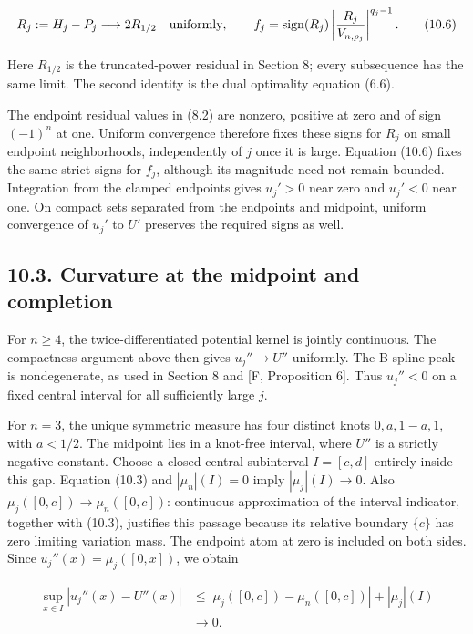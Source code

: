 \documentclass[11pt]{article}
\begin{document}
\[
R_j:=H_j-P_j\longrightarrow2R_{1/2}\quad\hbox{uniformly},
\qquad
f_j=\operatorname{sign}(R_j)
\left|\frac{R_j}{V_{n,p_j}}\right|^{q_j-1}.
\tag{10.6}
\]

Here \(R_{1/2}\) is the truncated-power residual in Section 8; every
subsequence has the same limit. The second identity is the dual
optimality equation (6.6).

The endpoint residual values in (8.2) are nonzero, positive at zero and
of sign \((-1)^n\) at one. Uniform convergence therefore fixes these
signs for \(R_j\) on small endpoint neighborhoods, independently of
\(j\) once it is large. Equation (10.6) fixes the same strict signs for
\(f_j\), although its magnitude need not remain bounded. Integration
from the clamped endpoints gives \(u_j'>0\) near zero and \(u_j'<0\)
near one. On compact sets separated from the endpoints and midpoint,
uniform convergence of \(u_j'\) to \(U'\) preserves the required signs
as well.

\subsection{10.3. Curvature at the midpoint and
completion}\label{curvature-at-the-midpoint-and-completion}

For \(n\ge4\), the twice-differentiated potential kernel is jointly
continuous. The compactness argument above then gives \(u_j''\to U''\)
uniformly. The B-spline peak is nondegenerate, as used in Section 8 and
{[}F, Proposition 6{]}. Thus \(u_j''<0\) on a fixed central interval for
all sufficiently large \(j\).

For \(n=3\), the unique symmetric measure has four distinct knots
\(0,a,1-a,1\), with \(a<1/2\). The midpoint lies in a knot-free
interval, where \(U''\) is a strictly negative constant. Choose a closed
central subinterval \(I=[c,d]\) entirely inside this gap. Equation
(10.3) and \(|\mu_n|(I)=0\) imply \(|\mu_j|(I)\to0\). Also
\(\mu_j([0,c])\to\mu_n([0,c])\): continuous approximation of the
interval indicator, together with (10.3), justifies this passage because
its relative boundary \(\{c\}\) has zero limiting variation mass. The
endpoint atom at zero is included on both sides. Since
\(u_j''(x)=\mu_j([0,x])\), we obtain

\[
\begin{split}
\sup_{x\in I}|u_j''(x)-U''(x)|
&\le |\mu_j([0,c])-\mu_n([0,c])|+|\mu_j|(I)\\
&\longrightarrow0.
\end{split}
\tag{10.7}
\]
\end{document}

